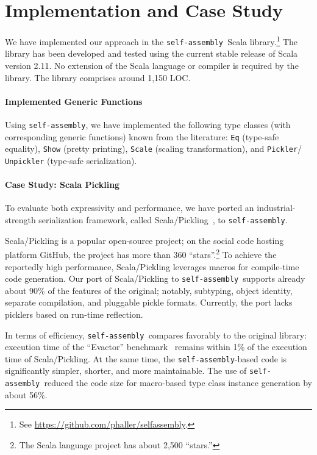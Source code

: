 \documentclass[preprint,nocopyrightspace]{sigplanconf}
\newcommand{\selfassembly}{\texttt{self-assembly~}}
\newcommand{\sselfassembly}{\texttt{self-assembly}}
\begin{document}
\section{Implementation and Case Study}

We have implemented our approach in the \selfassembly Scala
library.\footnote{See \url{https://github.com/phaller/selfassembly}.} The
library has been developed and tested using the current stable release of
Scala version 2.11. No extension of the Scala language or compiler is required
by the library. The library comprises around 1,150 LOC.

\paragraph{Implemented Generic Functions}

Using \sselfassembly, we have implemented the following type classes (with
corresponding generic functions) known from the literature: \verb|Eq|
(type-safe equality), \verb|Show| (pretty printing), \verb|Scale| (scaling
transformation), and \verb|Pickler|/\\\verb|Unpickler| (type-safe serialization).

\paragraph{Case Study: Scala Pickling}

To evaluate both expressivity and performance, we have ported an
industrial-strength serialization framework, called Scala/Pickling~\cite{Pickling}, to \sselfassembly.

Scala/Pickling is a popular open-source project; on the social code
hosting platform GitHub, the project has more than 360 ``stars''.\footnote{The
Scala language project has about 2,500 ``stars.''} To achieve the reportedly
high performance, Scala/Pickling leverages macros for compile-time code
generation. Our port of Scala/Pickling to \selfassembly supports
already about 90\% of the features of the original; notably, subtyping, object
identity, separate compilation, and pluggable pickle formats. Currently, the
port lacks picklers based on run-time reflection.

In terms of efficiency,  \selfassembly compares favorably to the original
library: execution time of the ``Evactor'' benchmark~\cite{Pickling} remains
within 1\% of the execution time of Scala/Pickling. At the same time,
the \sselfassembly-based code is significantly simpler, shorter, and more
maintainable. The use of \selfassembly reduced the code size for macro-based
type class instance generation by about 56\%.
\end{document}
